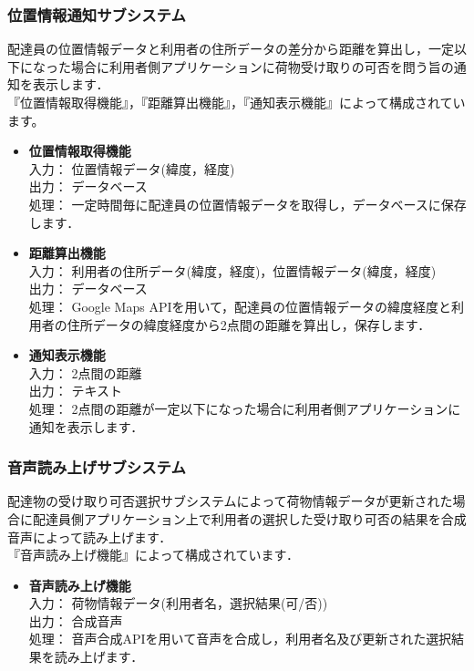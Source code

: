 \documentclass[a4j,titlepage]{jarticle}
\begin{document}
\subsubsection{位置情報通知サブシステム}
配達員の位置情報データと利用者の住所データの差分から距離を算出し，一定以下になった場合に利用者側アプリケーションに荷物受け取りの可否を問う旨の通知を表示します．\\
『位置情報取得機能』，『距離算出機能』，『通知表示機能』によって構成されています。
\begin{itemize}
\item \textbf{位置情報取得機能} \\
入力： 位置情報データ(緯度，経度) \\
出力： データベース \\
処理： 一定時間毎に配達員の位置情報データを取得し，データベースに保存します．
\item \textbf{距離算出機能} \\
入力： 利用者の住所データ(緯度，経度)，位置情報データ(緯度，経度) \\
出力： データベース \\
処理： Google Maps APIを用いて，配達員の位置情報データの緯度経度と利用者の住所データの緯度経度から2点間の距離を算出し，保存します．
\item \textbf{通知表示機能} \\
入力： 2点間の距離 \\
出力： テキスト \\
処理： 2点間の距離が一定以下になった場合に利用者側アプリケーションに通知を表示します．
\end{itemize}


\subsubsection{音声読み上げサブシステム}
配達物の受け取り可否選択サブシステムによって荷物情報データが更新された場合に配達員側アプリケーション上で利用者の選択した受け取り可否の結果を合成音声によって読み上げます． \\
『音声読み上げ機能』によって構成されています．
\begin{itemize}
\item \textbf{音声読み上げ機能} \\
入力： 荷物情報データ(利用者名，選択結果(可/否)) \\
出力： 合成音声\\
処理： 音声合成APIを用いて音声を合成し，利用者名及び更新された選択結果を読み上げます．
\end{itemize}
\end{document}
